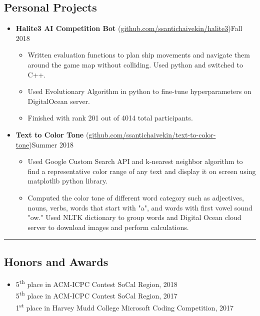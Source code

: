 \documentclass[10.5pt,letterpaper]{article}
\begin{document}
\subsection*{Personal Projects}
  \begin{itemize}
    \parskip=-0.45em
    \item[]
    {\textbf{Halite3 AI Competition Bot} (\href{https://github.com/ssantichaivekin/halite3}
    {github.com/ssantichaivekin/halite3})\hfill {Fall 2018}}
    \begin{itemize}[label=\textbullet]
        \item  Written evaluation functions to plan ship movements and navigate them around the game map without colliding.
        Used python and switched to C++.
        \item Used Evolutionary Algorithm in python to fine-tune hyperparameters on DigitalOcean server.
        \item Finished with rank 201 out of 4014 total participants.
    \end{itemize}
    \vspace{0.1em}
    \item[]
    {\textbf{Text to Color Tone} (\href{https://github.com/ssantichaivekin/text-to-color-tone}
    {github.com/ssantichaivekin/text-to-color-tone})\hfill {Summer 2018}}
    \begin{itemize}[label=\textbullet]
        \item  Used Google Custom Search API and k-nearest neighbor algorithm to find a representative color range 
        of any text and display it on screen using matplotlib python library.
        \item  Computed the color tone of different word category such as adjectives, nouns, verbs, 
        words that start with "a", and words with first vowel sound "ow." Used NLTK dictionary to 
        group words and Digital Ocean cloud server to download images and perform calculations.
    \end{itemize}
    \vspace{0.1em}
  \end{itemize}

\hrule
\vspace{-0.95em}
\subsection*{Honors and Awards}
  \begin{itemize}
    \parskip=-0.5em
    \item[]
    {5\textsuperscript{th} place in ACM-ICPC Contest SoCal Region, 2018}\\
    {5\textsuperscript{th} place in ACM-ICPC Contest SoCal Region, 2017}\\
    {1\textsuperscript{st} place in Harvey Mudd College Microsoft Coding Competition, 2017}
  \end{itemize}

\end{document}
